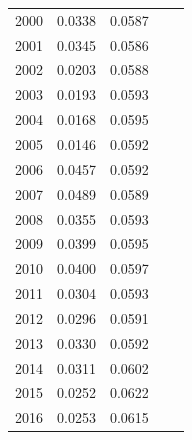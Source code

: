 \documentclass[12pt,]{article}
\begin{document}
\begin{table}[ht]
{\begin{tabular}{rrrll}
   2000 & 0.0338 & 0.0587 &  &  \\ 
   2001 & 0.0345 & 0.0586 &  &  \\ 
   2002 & 0.0203 & 0.0588 &  &  \\ 
   2003 & 0.0193 & 0.0593 &  &  \\ 
   2004 & 0.0168 & 0.0595 &  &  \\ 
   2005 & 0.0146 & 0.0592 &  &  \\ 
   2006 & 0.0457 & 0.0592 &  &  \\ 
   2007 & 0.0489 & 0.0589 &  &  \\ 
   2008 & 0.0355 & 0.0593 &  &  \\ 
   2009 & 0.0399 & 0.0595 &  &  \\ 
   2010 & 0.0400 & 0.0597 &  &  \\ 
   2011 & 0.0304 & 0.0593 &  &  \\ 
   2012 & 0.0296 & 0.0591 &  &  \\ 
   2013 & 0.0330 & 0.0592 &  &  \\ 
   2014 & 0.0311 & 0.0602 &  &  \\ 
   2015 & 0.0252 & 0.0622 &  &  \\ 
   2016 & 0.0253 & 0.0615 &  &  \\ 
   \hline
\end{tabular}
}
\end{table}

\FloatBarrier
\end{document}

